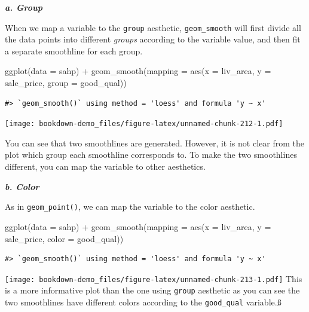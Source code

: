 \documentclass[
]{book}
\newenvironment{Shaded}{\begin{snugshade}}{\end{snugshade}}
\newcommand{\AttributeTok}[1]{\textcolor[rgb]{0.77,0.63,0.00}{#1}}
\newcommand{\FunctionTok}[1]{\textcolor[rgb]{0.00,0.00,0.00}{#1}}
\newcommand{\NormalTok}[1]{#1}
\newcommand{\SpecialCharTok}[1]{\textcolor[rgb]{0.00,0.00,0.00}{#1}}
\begin{document}
\textbf{\emph{a. Group}}

When we map a variable to the \texttt{group} aesthetic, \texttt{geom\_smooth} will first divide all the data points into different \emph{groups} according to the variable value, and then fit a separate smoothline for each group.

\begin{Shaded}
\begin{Highlighting}[]
\FunctionTok{ggplot}\NormalTok{(}\AttributeTok{data =}\NormalTok{ sahp) }\SpecialCharTok{+} \FunctionTok{geom\_smooth}\NormalTok{(}\AttributeTok{mapping =} \FunctionTok{aes}\NormalTok{(}\AttributeTok{x =}\NormalTok{ liv\_area, }\AttributeTok{y =}\NormalTok{ sale\_price, }\AttributeTok{group =}\NormalTok{ good\_qual))}
\end{Highlighting}
\end{Shaded}

\begin{verbatim}
#> `geom_smooth()` using method = 'loess' and formula 'y ~ x'
\end{verbatim}

\texttt{[image: bookdown-demo\_files/figure-latex/unnamed-chunk-212-1.pdf]}

You can see that two smoothlines are generated. However, it is not clear from the plot which group each smoothline corresponds to. To make the two smoothlines different, you can map the variable to other aesthetics.

\textbf{\emph{b. Color}}

As in \texttt{geom\_point()}, we can map the variable to the color aesthetic.

\begin{Shaded}
\begin{Highlighting}[]
\FunctionTok{ggplot}\NormalTok{(}\AttributeTok{data =}\NormalTok{ sahp) }\SpecialCharTok{+} \FunctionTok{geom\_smooth}\NormalTok{(}\AttributeTok{mapping =} \FunctionTok{aes}\NormalTok{(}\AttributeTok{x =}\NormalTok{ liv\_area, }\AttributeTok{y =}\NormalTok{ sale\_price, }\AttributeTok{color =}\NormalTok{ good\_qual))}
\end{Highlighting}
\end{Shaded}

\begin{verbatim}
#> `geom_smooth()` using method = 'loess' and formula 'y ~ x'
\end{verbatim}

\texttt{[image: bookdown-demo\_files/figure-latex/unnamed-chunk-213-1.pdf]}
This is a more informative plot than the one using \texttt{group} aesthetic as you can see the two smoothlines have different colors according to the \texttt{good\_qual} variable.ß
\end{document}
